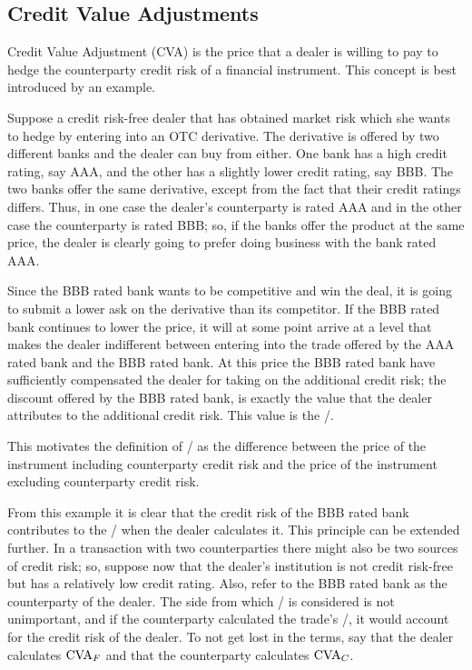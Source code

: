\documentclass[main.tex]{subfiles}
\begin{document}
    \subsection{Credit Value Adjustments}
        Credit Value Adjustment (CVA) is the price that a dealer is willing to pay 
        to hedge the counterparty credit risk of a financial instrument.
        This concept is best introduced by an example. 
        
        \begin{example}
        Suppose a credit risk-free dealer that has obtained market risk 
        which she wants to hedge by entering into an OTC derivative.
        The derivative is offered by two different banks and the dealer can buy from either.
        One bank has a high credit rating, say AAA, and the other has a slightly lower credit rating, say BBB. 
        The two banks offer the same derivative, except from the fact that their credit ratings differs.
        Thus, in one case the dealer's counterparty is rated AAA and in the other case the counterparty is rated BBB;
        so, if the banks offer the product at the same price, 
        the dealer is clearly going to prefer doing business with the bank rated AAA.

        Since the BBB rated bank wants to be competitive and win the deal,
        it is going to submit a lower ask on the derivative than its competitor.
        If the BBB rated bank continues to lower the price, it will at some point arrive at a level
        that makes the dealer indifferent between entering into the trade 
        offered by the AAA rated bank and the BBB rated bank.
        At this price the BBB rated bank have sufficiently compensated the dealer for taking on the additional credit risk;
        the discount offered by the BBB rated bank, 
        is exactly the value that the dealer attributes to the additional credit risk. 
        This value is the \CVA/.

        This motivates the definition of \CVA/ as the difference between the price of the instrument 
        including counterparty credit risk and the price of the instrument excluding counterparty credit risk.
        \end{example}

        From this example it is clear that the credit risk of the BBB rated bank contributes to the \CVA/
        when the dealer calculates it.
        This principle can be extended further.
        In a transaction with two counterparties there might also be two sources of credit risk;
        so, suppose now that the dealer's institution is not credit risk-free 
        but has a relatively low credit rating.
        Also, refer to the BBB rated bank as the counterparty of the dealer.
        The side from which \CVA/ is considered is not unimportant,
        and if the counterparty calculated the trade's \CVA/, it would account for the credit risk of the dealer.
        To not get lost in the terms, say that the dealer calculates $\CVA/_{F}$ 
        and that the counterparty calculates $\CVA/_{C}$.
\end{document}
